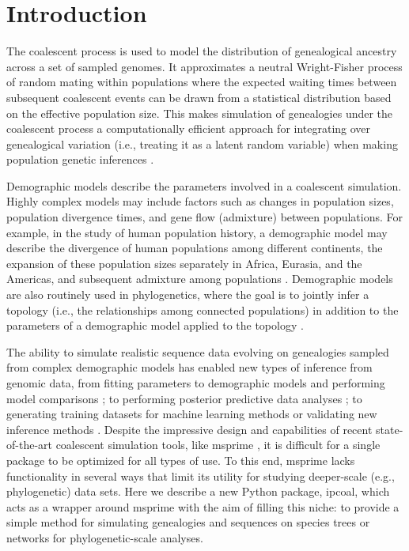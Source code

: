 \documentclass[11pt]{article}
\begin{document}
\RaggedRight
\bigskip

\section{Introduction}
The coalescent process \cite{kingman_coalescent_1982,hudson_testing_1983} is used to model the distribution of genealogical ancestry across a set of sampled genomes. It approximates a neutral Wright-Fisher process of random mating within populations where the expected waiting times between subsequent coalescent events can be drawn from a statistical distribution based on the effective population size. This makes simulation of genealogies under the coalescent process \cite{hudson_generating_2002} a computationally efficient approach for integrating over genealogical variation (i.e., treating it as a latent random variable) when making population genetic inferences \cite{beerli_coalescent_2001}. 

Demographic models describe the parameters involved in a coalescent simulation. Highly complex models may include factors such as changes in population sizes, population divergence times, and gene flow (admixture) between populations. For example, in the study of human population history, a demographic model may describe the divergence of human populations among different continents, the expansion of these population sizes separately in Africa, Eurasia, and the Americas, and subsequent admixture among populations \cite{reich_who_2018,green_neandertal_2010,gronau_demography_2011}. Demographic models are also routinely used in phylogenetics, where the goal is to jointly infer a topology (i.e., the relationships among connected populations) in addition to the parameters of a demographic model applied to the topology \cite{degnan_gene_2009,knowles_estimating_2011}. 

The ability to simulate realistic sequence data evolving on genealogies sampled from complex demographic models has enabled new types of inference from genomic data, from fitting parameters to demographic models and performing model comparisons \cite{chung_bayesian_2017}; to performing posterior predictive data analyses \cite{brown_predictive_2014}; to generating training datasets for machine learning methods \cite{schrider_learning_2017} or validating new inference methods \cite{adrion_community_maintained_2019}. Despite the impressive design and capabilities of recent state-of-the-art coalescent simulation tools, like msprime \cite{kelleher_efficient_2016}, it is difficult for a single package to be optimized for all types of use. To this end, msprime lacks functionality in several ways that limit its utility for studying deeper-scale (e.g., phylogenetic) data sets. Here we describe a new Python package, ipcoal, which acts as a wrapper around msprime with the aim of filling this niche: to provide a simple method for simulating genealogies and sequences on species trees or networks for phylogenetic-scale analyses.
\end{document}
